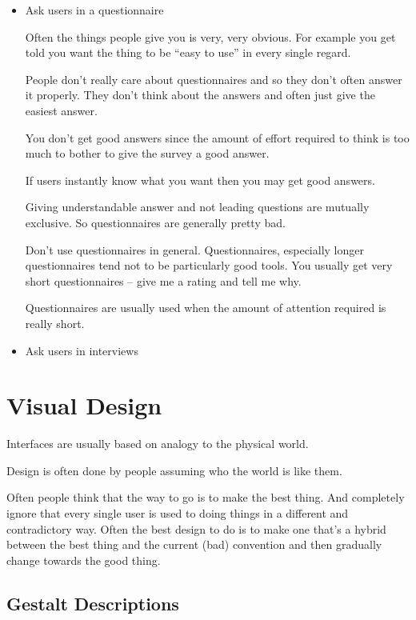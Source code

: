 \documentclass[10pt, a4paper]{article}
\begin{document}
\begin{itemize}

\item Ask users in a questionnaire

Often the things people give you is very, very obvious. For example you get told you want the thing to be ``easy to
use'' in every single regard.

People don't really care about questionnaires and so they don't often answer it properly. They don't think about the
answers and often just give the easiest answer.

You don't get good answers since the amount of effort required to think is too much to bother to give the survey a
good answer.

If users instantly know what you want then you may get good answers.

Giving understandable answer and not leading questions are mutually exclusive. So questionnaires are generally pretty
bad.

Don't use questionnaires in general. Questionnaires, especially longer questionnaires tend not to be particularly
good tools. You usually get very short questionnaires -- give me a rating and tell me why.

Questionnaires are usually used when the amount of attention required is really short.

\item Ask users in interviews

\end{itemize}

\section{Visual Design}

Interfaces are usually based on analogy to the physical world.

Design is often done by people assuming who the world is like them.

Often people think that the way to go is to make the best thing. And completely ignore that every single user is used
to doing things in a different and contradictory way. Often the best design to do is to make one that's a hybrid
between the best thing and the current (bad) convention and then gradually change towards the good thing.

\subsection{Gestalt Descriptions}
\end{document}
